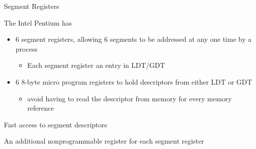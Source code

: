 \begin{frame}{Segment Registers}
  \begin{block}{The Intel Pentium has}
    \begin{itemize}
    \item \alert{6 segment registers}, allowing 6 segments to be addressed at
      any one time by a process
      \begin{itemize}
      \item Each segment register {\pright} an entry in LDT/GDT
      \end{itemize}
    \item \alert{6 8-byte micro program registers} to hold descriptors from either LDT or GDT
      \begin{itemize}
      \item avoid having to read the descriptor from memory for every memory reference
      \end{itemize}
    \end{itemize}
  \end{block}
  \begin{center}
     
  \end{center}

\end{frame}

\begin{frame}{Fast access to segment descriptors}
  \begin{block}{An additional nonprogrammable register for each segment register}
    \begin{center}
    \end{center}
  \end{block}
\end{frame}

